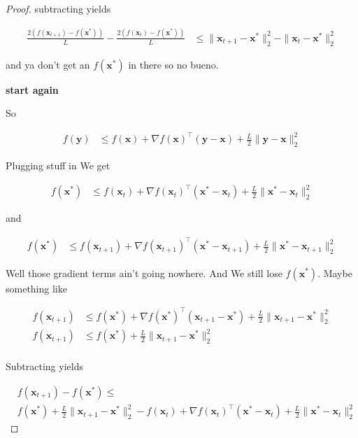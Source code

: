 \documentclass{article}
\begin{document}
\begin{proof}
	subtracting yields
	
	\begin{align}
		\frac{2(f(\mathbf{x}_{t+1}) - f(\mathbf{x}^*))}{L} - \frac{2(f(\mathbf{x}_t) -  f(\mathbf{x}^*))}{L} &\le  \|\mathbf{x}_{t+1}-\mathbf{x}^*\|^2_2 - \|\mathbf{x}_t-\mathbf{x}^*\|^2_2
	\end{align}
	
	and ya don't get an $f(\mathbf{x}^*)$ in there so no bueno. 
	
	\textbf{start again}
	
	So
	
	\begin{align}
		f(\mathbf{y}) &\le f(\mathbf{x}) + \nabla f(\mathbf{x})^\top(\mathbf{y}-\mathbf{x}) + \frac{L}{2}\|\mathbf{y}-\mathbf{x}\|^2_2
	\end{align}
	
	Plugging stuff in We get
	
	\begin{align}
		f(\mathbf{x}^*) &\le f(\mathbf{x}_t) + \nabla f(\mathbf{x}_t)^\top(\mathbf{x}^*-\mathbf{x}_t) + \frac{L}{2}\|\mathbf{x}^*-\mathbf{x}_t\|^2_2
	\end{align}
	
	and
	
	\begin{align}
		f(\mathbf{x}^*) &\le f(\mathbf{x}_{t+1}) + \nabla f(\mathbf{x}_{t+1})^\top(\mathbf{x}^*-\mathbf{x}_{t+1}) + \frac{L}{2}\|\mathbf{x}^*-\mathbf{x}_{t+1}\|^2_2
	\end{align}
	
	Well those gradient terms ain't going nowhere. And We still lose $f(\mathbf{x}^*)$.  Maybe something like 
	
	\begin{align}
		f(\mathbf{x}_{t+1}) &\le f(\mathbf{x}^*) + \nabla f(\mathbf{x}^*)^\top(\mathbf{x}_{t+1} - \mathbf{x}^*) + \frac{L}{2}\|\mathbf{x}_{t+1} - \mathbf{x}^*\|^2_2\\
		f(\mathbf{x}_{t+1}) &\le f(\mathbf{x}^*) + \frac{L}{2}\|\mathbf{x}_{t+1} - \mathbf{x}^*\|^2_2\\
	\end{align}
	
	Subtracting yields
	
	\begin{align}
		&f(\mathbf{x}_{t+1}) - f(\mathbf{x}^*) \le \\
		&f(\mathbf{x}^*) + \frac{L}{2}\|\mathbf{x}_{t+1} - \mathbf{x}^*\|^2_2 -  f(\mathbf{x}_t) + \nabla f(\mathbf{x}_t)^\top(\mathbf{x}^*-\mathbf{x}_t) + \frac{L}{2}\|\mathbf{x}^*-\mathbf{x}_t\|^2_2
	\end{align}
	

\end{proof}
\end{document}
